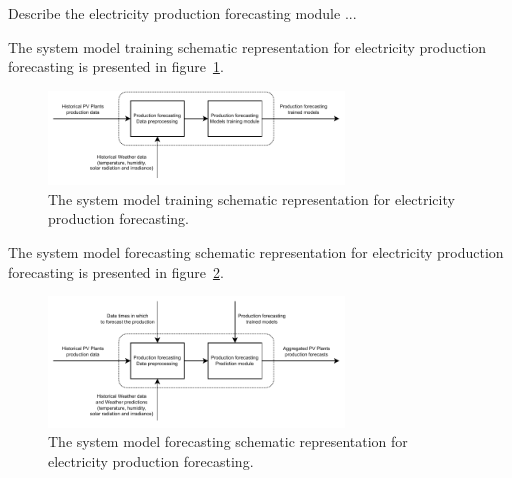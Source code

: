 Describe the electricity production forecasting module ...

The system model training schematic representation for electricity production forecasting is presented in figure~\ref{fig:modeltrainingproduction}.

\begin{figure}[H]
\centering 
\includegraphics[width=0.7\textwidth]{images/system_model_training_production}
\caption{The system model training schematic representation for electricity production forecasting.}
\label{fig:modeltrainingproduction}
\end{figure}

The system model forecasting schematic representation for electricity production forecasting is presented in figure~\ref{fig:modelforecastingproduction}.

\begin{figure}[H]
\centering 
\includegraphics[width=0.7\textwidth]{images/system_model_forecasting_production}
\caption{The system model forecasting schematic representation for electricity production forecasting.}
\label{fig:modelforecastingproduction}
\end{figure}
